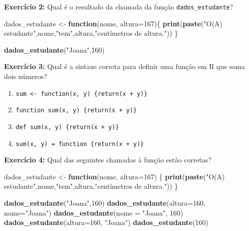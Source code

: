 \documentclass[
]{book}
\newenvironment{Shaded}{\begin{snugshade}}{\end{snugshade}}
\newcommand{\AttributeTok}[1]{\textcolor[rgb]{0.13,0.29,0.53}{#1}}
\newcommand{\ControlFlowTok}[1]{\textcolor[rgb]{0.13,0.29,0.53}{\textbf{#1}}}
\newcommand{\DecValTok}[1]{\textcolor[rgb]{0.00,0.00,0.81}{#1}}
\newcommand{\FunctionTok}[1]{\textcolor[rgb]{0.13,0.29,0.53}{\textbf{#1}}}
\newcommand{\NormalTok}[1]{#1}
\newcommand{\OtherTok}[1]{\textcolor[rgb]{0.56,0.35,0.01}{#1}}
\newcommand{\StringTok}[1]{\textcolor[rgb]{0.31,0.60,0.02}{#1}}
\begin{document}
\textbf{Exercício 2:} Qual é o resultado da chamada da função
\texttt{dados\_estudante}?

\begin{Shaded}
\begin{Highlighting}[]
\NormalTok{dados\_estudante }\OtherTok{\textless{}{-}} \ControlFlowTok{function}\NormalTok{(nome, }\AttributeTok{altura=}\DecValTok{167}\NormalTok{)\{}
  \FunctionTok{print}\NormalTok{(}\FunctionTok{paste}\NormalTok{(}\StringTok{"O(A) estudante"}\NormalTok{,nome,}\StringTok{"tem"}\NormalTok{,altura,}\StringTok{"centímetros de altura."}\NormalTok{))}
\NormalTok{\}}

\FunctionTok{dados\_estudante}\NormalTok{(}\StringTok{"Joana"}\NormalTok{,}\DecValTok{160}\NormalTok{)}
\end{Highlighting}
\end{Shaded}

\textbf{Exercício 3:} Qual é a sintaxe correta para definir uma função em R
que soma dois números?

\begin{enumerate}
\def\labelenumi{(\alph{enumi})}
\item
  \texttt{sum\ \textless{}-\ function(x,\ y)\ \{return(x\ +\ y)\}}
\item
  \texttt{function\ sum(x,\ y)\ \{return(x\ +\ y)\}}
\item
  \texttt{def\ sum(x,\ y)\ \{return(x\ +\ y)\}}
\item
  \texttt{sum(x,\ y)\ =\ function\ \{return(x\ +\ y)\}}
\end{enumerate}

\textbf{Exercício 4:} Qual das seguintes chamadas à função estão corretas?

\begin{Shaded}
\begin{Highlighting}[]
\NormalTok{dados\_estudante }\OtherTok{\textless{}{-}} \ControlFlowTok{function}\NormalTok{(nome, }\AttributeTok{altura=}\DecValTok{167}\NormalTok{) \{}
  \FunctionTok{print}\NormalTok{(}\FunctionTok{paste}\NormalTok{(}\StringTok{"O(A) estudante"}\NormalTok{,nome,}\StringTok{"tem"}\NormalTok{,altura,}\StringTok{"centímetros de altura."}\NormalTok{))}
\NormalTok{\}}

\FunctionTok{dados\_estudante}\NormalTok{(}\StringTok{"Joana"}\NormalTok{,}\DecValTok{160}\NormalTok{)}
\FunctionTok{dados\_estudante}\NormalTok{(}\AttributeTok{altura=}\DecValTok{160}\NormalTok{, }\AttributeTok{nome=}\StringTok{"Joana"}\NormalTok{)}
\FunctionTok{dados\_estudante}\NormalTok{(}\AttributeTok{nome =} \StringTok{"Joana"}\NormalTok{, }\DecValTok{160}\NormalTok{)}
\FunctionTok{dados\_estudante}\NormalTok{(}\AttributeTok{altura=}\DecValTok{160}\NormalTok{, }\StringTok{"Joana"}\NormalTok{)}
\FunctionTok{dados\_estudante}\NormalTok{(}\DecValTok{160}\NormalTok{)}
\end{Highlighting}
\end{Shaded}
\end{document}
